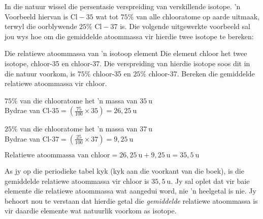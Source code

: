 In die natuur wissel die persentasie verspreiding van verskillende isotope.  'n Voorbeeld hiervan is $\text{Cl}-35$ wat tot $75\%$ van alle chlooratome op aarde uitmaak, terwyl die oorblywende $25\%$ $\text{Cl}-37$ is. Die volgende uitgewerkte voorbeeld sal jou wys
hoe om die gemiddelde atoommassa vir hierdie twee isotope te bereken: \par  
\begin{wex}{Die relatiewe atoommassa van 'n isotoop element}{
Die element chloor het twee isotope, chloor-35 en chloor-37. Die verspreiding van hierdie isotope soos dit in die natuur voorkom, is $75\%$ chloor-35 en $25\%$ chloor-37. Bereken die gemiddelde relatiewe atoommassa vir chloor.
}
{
$75\%$ van die chlooratome het 'n massa van $35~\text{u}$ \\
Bydrae van $\text{Cl-}35 = (\frac{75}{100} \times 35) = 26,25~\text{u}$

$25\%$ van die chlooratome het 'n massa van $37~\text{u}$ \\ 
Bydrae van $\text{Cl-}37 = (\frac{25}{100} \times 37) = 9,25~\text{u}$


$\text{Relatiewe atoommassa van chloor} = 26,25~\text{u} + 9,25~\text{u} = 35,5~\text{u}$ \\
}
\end{wex}
As jy op die periodieke tabel kyk (kyk aan die voorkant van die boek), is die gemiddelde relatiewe atoommassa vir chloor is $35,5~\text{u}$. Jy sal oplet dat vir baie elemente die relatiewe atoommassa wat aangedui word, nie 'n heelgetal is nie. Jy behoort nou te verstaan ​dat hierdie getal die \textsl{gemiddelde} relatiewe atoommassa is vir daardie elemente wat natuurlik voorkom as isotope.\par





